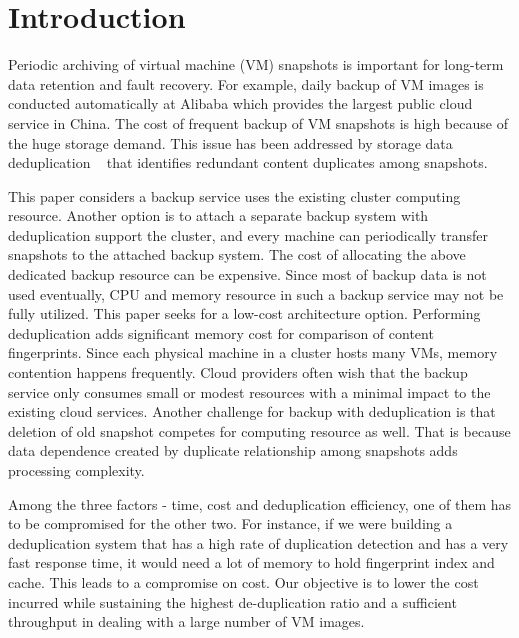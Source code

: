 \section{Introduction}



Periodic  archiving of virtual machine (VM) snapshots is important 
for long-term data  retention and fault recovery. 
For example, daily backup of VM images  is conducted automatically 
at Alibaba which provides the largest public cloud service in China.
The cost of frequent backup of VM snapshots is  high because of the huge storage demand.
This issue has been addressed by   storage data deduplication ~\cite{venti02,bottleneck08} that
identifies redundant content duplicates among snapshots.  

This paper considers a backup service uses the existing cluster computing resource.
Another option is to attach  a separate backup system with deduplication
support the cluster, and  every machine can periodically transfer snapshots to
the attached backup system.
The cost of allocating the above dedicated backup  resource can be expensive.
Since most of backup data is not used eventually, CPU and memory resource in such a backup service may
not be fully utilized. This paper seeks for a low-cost architecture option.
Performing
deduplication adds significant  memory cost for comparison of content fingerprints. 
Since each physical machine in a cluster  hosts many VMs, memory contention happens frequently. 
Cloud providers often wish that the backup service only consumes  small or modest resources 
with a minimal impact to the existing cloud services.  Another challenge for backup with deduplication is 
that deletion of old snapshot competes for computing resource as well. That is because data dependence created 
by duplicate relationship among snapshots  adds processing complexity.

Among the three factors - time, cost and deduplication efficiency, one of them has to be compromised for the other two. For instance, if we were building a deduplication system that has a high rate of duplication detection and has a very fast response time, 
it would need a lot of memory to hold fingerprint index and cache.  This leads to a compromise on cost. 
Our objective is to lower the cost incurred while sustaining the highest de-duplication ratio
and  a sufficient throughput in dealing with a large number of VM images. 


